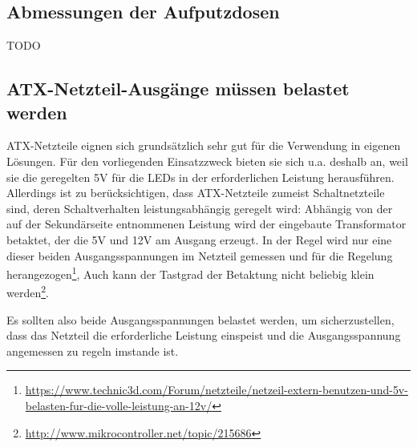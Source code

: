 \subsection{Abmessungen der Aufputzdosen}

TODO

\subsection{ATX-Netzteil-Ausg\"ange m\"ussen belastet werden}
ATX-Netzteile eignen sich grunds\"atzlich sehr gut
f\"ur die Verwendung in eigenen L\"osungen.
F\"ur den vorliegenden Einsatzzweck bieten sie sich u.a. deshalb an,
weil sie die geregelten 5V
f\"ur die LEDs
in der erforderlichen Leistung
herausf\"uhren.
Allerdings ist zu ber\"ucksichtigen,
dass ATX-Netzteile zumeist Schaltnetzteile sind,
deren Schaltverhalten leistungsabh\"angig geregelt wird:
Abhängig von der auf der Sekund\"arseite entnommenen Leistung
wird der eingebaute Transformator betaktet,
der die 5V und 12V am Ausgang erzeugt.
In der Regel wird nur eine dieser beiden Ausgangsspannungen
im Netzteil gemessen und f\"ur die Regelung
herangezogen\footnote{\url{https://www.technic3d.com/Forum/netzteile/netzeil-extern-benutzen-und-5v-belasten-fur-die-volle-leistung-an-12v/}},
Auch kann der Tastgrad der Betaktung nicht beliebig klein
werden\footnote{\url{http://www.mikrocontroller.net/topic/215686}}.

Es sollten also beide Ausgangsspannungen belastet werden,
um sicherzustellen,
dass das Netzteil die erforderliche Leistung einspeist
und die Ausgangsspannung angemessen zu regeln imstande ist.

